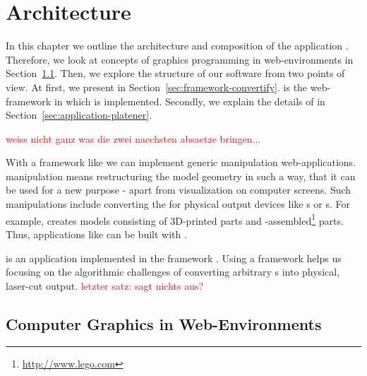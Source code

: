 \documentclass[../ClassicThesis.tex]{subfiles}
\begin{document}
\newcommand\myNotes[1]{\textcolor{red}{#1}}
\newcommand{\note}[1]{\myNotes{#1}}
\newcommand{\class}[1]{\emph{#1}}
\newcommand{\name}[1]{\textit{#1}}


\chapter{Architecture}
\label{ch:architecture}

In this chapter we outline the architecture and composition of the
application {\platener}. Therefore, we look at concepts of graphics
programming in web-environments in Section~\ref{sec:cg-web}. Then, we
explore the structure of our software from two points of view. At
first, we present {\convertify} in
Section~\ref{sec:framework-convertify}. {\convertify} is the
web-framework in which {\platener} is implemented. Secondly, we
explain the details of {\platener} in
Section~\ref{sec:application-platener}.

\note{weiss nicht ganz was die zwei naechsten absaetze
  bringen...}

With a framework like {\convertify} we can implement generic
{\threedmodel} manipulation web-applications. {\threedmodel}
manipulation means restructuring the model geometry in such a way,
that it can be used for a new purpose - apart from visualization on
computer screens. Such manipulations include converting the
{\threedmodel} for physical output devices like {\threedprinter}s or
{\lasercutter}s. For example, {\brickify} creates models consisting of
3D-printed parts and
{\lego}-assembled\footnote{\url{http://www.lego.com}} parts. Thus,
applications like
{\brickify} can be built with {\convertify}.

{\platener} is an application implemented in the framework {\convertify}.
Using a framework helps us focusing on the algorithmic challenges of
converting arbitrary {\threedmodel}s into physical, laser-cut output.
\note{letzter satz: sagt nichts aus?}

\section{Computer Graphics in Web-Environments}
\label{sec:cg-web}
\end{document}
